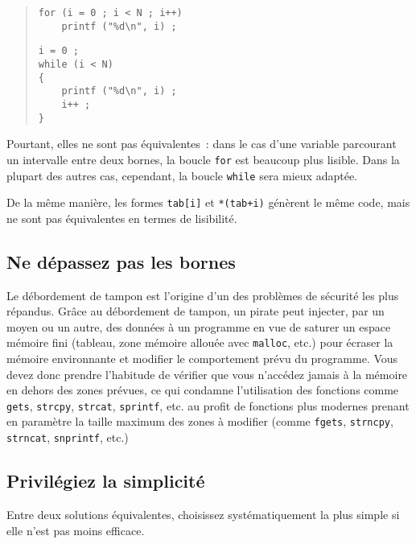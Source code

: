 \documentclass {article}
\begin{document}
\begin {quote}
\begin {minipage} {.4\textwidth}
\begin {lstlisting}
for (i = 0 ; i < N ; i++)
    printf ("%
\end{lstlisting}
\end {minipage}
\hfill
\begin {minipage} {.4\textwidth}
\begin {lstlisting}
i = 0 ;
while (i < N)
{
    printf ("%
    i++ ;
}
\end{lstlisting}
\end {minipage}
\end {quote}

Pourtant, elles ne sont pas équivalentes~: dans le cas d'une variable
parcourant un intervalle entre deux bornes, la boucle \texttt {for}
est beaucoup plus lisible. Dans la plupart des autres cas, cependant,
la boucle \texttt {while} sera mieux adaptée.

De la même manière, les formes \texttt {tab[i]} et \texttt {*(tab+i)}
génèrent le même code, mais ne sont pas équivalentes en termes
de lisibilité.


\subsection {Ne dépassez pas les bornes}

Le débordement de tampon est l'origine d'un des problèmes de sécurité
les plus répandus. Grâce au débordement de tampon, un pirate peut
injecter, par un moyen ou un autre, des données à un programme en vue
de saturer un espace mémoire fini (tableau, zone mémoire allouée avec
\texttt {malloc}, etc.) pour écraser la mémoire environnante et modifier
le comportement prévu du programme.  Vous devez donc prendre l'habitude
de vérifier que vous n'accédez jamais à la mémoire en dehors des
zones prévues, ce qui condamne l'utilisation des fonctions comme
\texttt {gets}, \texttt {strcpy}, \texttt {strcat}, \texttt {sprintf},
etc. au profit de fonctions plus modernes prenant en paramètre la taille
maximum des zones à modifier (comme \texttt {fgets}, \texttt {strncpy},
\texttt {strncat}, \texttt {snprintf}, etc.)


\subsection {Privilégiez la simplicité}

Entre deux solutions équivalentes, choisissez systématiquement la plus
simple si elle n'est pas moins efficace.
\end{document}
